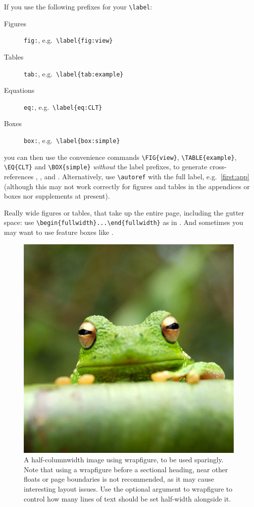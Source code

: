 \documentclass[9pt]{livecoms}
\begin{document}
If you use the following prefixes for your \verb|\label|:
%
\begin{description}
\item[Figures] \texttt{fig:}, e.g.~\verb|\label{fig:view}|
\item[Tables] \texttt{tab:}, e.g.~\verb|\label{tab:example}|
\item[Equations] \texttt{eq:}, e.g.~\verb|\label{eq:CLT}|
\item[Boxes] \texttt{box:}, e.g.~\verb|\label{box:simple}|
\end{description}
%
you can then use the convenience commands \verb|\FIG{view}|, \verb|\TABLE{example}|, \verb|\EQ{CLT}| and \verb|\BOX{simple}| \emph{without} the label prefixes, to generate cross-references , ,  and . Alternatively, use \verb|\autoref| with the full label, e.g.~\autoref{first:app} (although this may not work correctly for figures and tables in the appendices or boxes nor supplements at present).

Really wide figures or tables, that take up the entire page, including the gutter space: use \verb|\begin{fullwidth}...\end{fullwidth}| as in . And sometimes you may want to use feature boxes like .

\begin{figure}
\includegraphics[width=\hsize]{frog}
\caption{A half-columnwidth image using wrapfigure, to be used sparingly. Note that using a wrapfigure before a sectional heading, near other floats or page boundaries is not recommended, as it may cause interesting layout issues. Use the optional argument to wrapfigure to control how many lines of text should be set half-width alongside it.}
\label{fig:halfwidth}
\end{figure}
\end{document}
